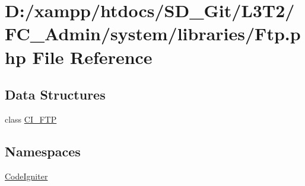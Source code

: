 \hypertarget{_admin_2system_2libraries_2_ftp_8php}{}\section{D\+:/xampp/htdocs/\+S\+D\+\_\+\+Git/\+L3\+T2/\+F\+C\+\_\+\+Admin/system/libraries/\+Ftp.php File Reference}
\label{_admin_2system_2libraries_2_ftp_8php}
\subsection*{Data Structures}
\begin{DoxyCompactItemize}
\item 
class \hyperlink{class_c_i___f_t_p}{C\+I\+\_\+\+F\+T\+P}
\end{DoxyCompactItemize}
\subsection*{Namespaces}
\begin{DoxyCompactItemize}
\item 
 \hyperlink{namespace_code_igniter}{Code\+Igniter}
\end{DoxyCompactItemize}
